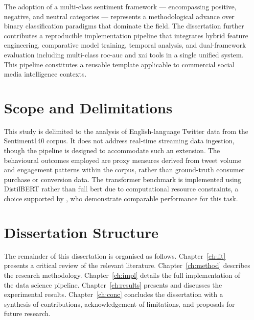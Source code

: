 The adoption of a multi-class sentiment framework --- encompassing positive, negative, and neutral categories --- represents a methodological advance over binary classification paradigms that dominate the field. The dissertation further contributes a reproducible implementation pipeline that integrates hybrid feature engineering, comparative model training, temporal analysis, and dual-framework evaluation including multi-class \gls{roc}-\gls{auc} and \gls{xai} tools in a single unified system. This pipeline constitutes a reusable template applicable to commercial social media intelligence contexts.

\section{Scope and Delimitations}

This study is delimited to the analysis of English-language Twitter data from the Sentiment140 corpus. It does not address real-time streaming data ingestion, though the pipeline is designed to accommodate such an extension. The behavioural outcomes employed are proxy measures derived from tweet volume and engagement patterns within the corpus, rather than ground-truth consumer purchase or conversion data. The transformer benchmark is implemented using DistilBERT rather than full \gls{bert} due to computational resource constraints, a choice supported by \citet{sanh2019distilbert}, who demonstrate comparable performance for this task.

\section{Dissertation Structure}

The remainder of this dissertation is organised as follows. Chapter~\ref{ch:lit} presents a critical review of the relevant literature. Chapter~\ref{ch:method} describes the research methodology. Chapter~\ref{ch:impl} details the full implementation of the data science pipeline. Chapter~\ref{ch:results} presents and discusses the experimental results. Chapter~\ref{ch:conc} concludes the dissertation with a synthesis of contributions, acknowledgement of limitations, and proposals for future research.
